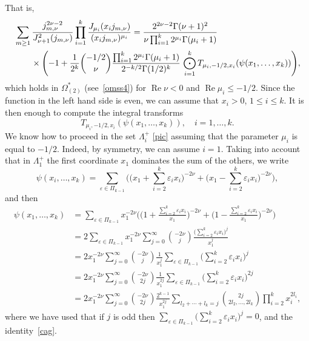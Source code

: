 \documentclass[12pt,leqno]{amsart}
\numberwithin{equation}{section}
\theoremstyle{plain}
\newcommand{\eps}{\varepsilon}
\renewcommand{\Re}{\operatorname{Re}}
\begin{document}
That is,
\begin{align}
\label{net1}
& \sum_{m\ge 1} \frac{j_{m,\nu}^{2\nu-2}}{J^2_{\nu+1}(j_{m,\nu})}
\prod_{i=1}^k\frac{J_{\mu_i}(x_ij_{m,\nu})}{(x_ij_{m,\nu})^{\mu_i}}
= \frac{2^{2\nu-2}\Gamma(\nu+1)^2}{\nu \prod_{i=1}^k2^{\mu_i}\Gamma(\mu_i+1)}
\\
\nonumber
&\qquad\null \times\Bigg({-}1+\frac{1}{2^k} \binom{-1/2}{\nu}
\frac{\prod_{i=1}^k 2^{\mu_i}\Gamma(\mu_i+1)}{2^{-k/2}\Gamma(1/2)^{k}}
\, \bigodot_{i=1}^k T_{\mu_i,-1/2,x_i}(\psi(x_1,\dots,x_k)) \Bigg),
\end{align}
which holds in $\Omega^*_{(2)}$ (see~\eqref{omss4}) for $\Re \nu<0$ and $\Re \mu_i\le -1/2$.
Since the function in the left hand side is even, we can assume that $x_i>0$, $1\le i\le k$.
It is then enough to compute the integral transforms
\begin{equation*}
T_{\mu_i,-1/2,x_i}(\psi(x_1,\dots,x_k)),\quad i=1,\dots , k.
\end{equation*}
We know how to proceed in the set $\Lambda_{i}^+$ \eqref{pic} assuming that the parameter $\mu_i$ is equal to $-1/2$. Indeed, by symmetry, we can assume $i=1$. Taking into account that in $\Lambda_{1}^+$ the first coordinate $x_1$ dominates the sum of the others, we write
\[
\psi(x_i,\dots, x_k)= \sum_{\eps \in \Pi_{k-1}}
\bigg( \Big(x_1+ \sum_{i=2}^k\eps_ix_i\Big)^{-2\nu}
+ \Big(x_1- \sum_{i=2}^k \eps_ix_i\Big)^{-2\nu} \bigg),
\]
and then
\begin{align}
\nonumber
\psi(x_1,\dots,x_k) &= \sum_{\eps \in \Pi_{k-1}}x_1 ^{-2\nu}
\Bigg( \bigg(1+\frac{ \sum_{i=2}^k\eps_ix_i}{x_1}\bigg)^{-2\nu}
+ \bigg( 1-\frac{ \sum_{i=2}^k\eps_ix_i}{x_1}\bigg) ^{-2\nu}\Bigg) \\
\nonumber
 &= 2 \sum_{\eps \in \Pi_{k-1}}x_1 ^{-2\nu} \sum_{j=0}^\infty
 \binom{-2\nu}{j}\frac{\big( \sum_{i=2}^k\eps _ix_i\big)^j}{x_1^j} \\
 \nonumber
 &= 2x_1^{-2\nu} \sum_{j=0}^\infty \binom{-2\nu}{j}\frac{1}{x_1^{j}}
 \sum_{\eps \in \Pi_{k-1}} \Big( \sum_{i=2}^k\eps _ix_i \Big)^{j} \\
 \nonumber
 &= 2x_1^{-2\nu} \sum_{j=0}^\infty \binom{-2\nu}{2j}\frac{1}{x_1^{2j}}
 \sum_{\eps \in \Pi_{k-1}} \Big( \sum_{i=2}^k\eps _ix_i \Big)^{2j} \\
\label{expi}
 &= 2x_1^{-2\nu} \sum_{j=0}^\infty \binom{-2\nu}{2j} \frac{2^{k-1}}{x_1^{2j}}
 \sum_{l_2+\cdots+l_k=j}
\binom{2j}{2l_2,\dots,2l_k} \prod_{i=2}^k x_i^{2l_{i}},
\end{align}
where we have used that if $j$ is odd then $\sum_{\eps \in \Pi_{k-1}} \big(\sum_{i=2}^k\eps _ix_i\big)^{j} = 0$, and the identity~\eqref{cag}.
\end{document}
